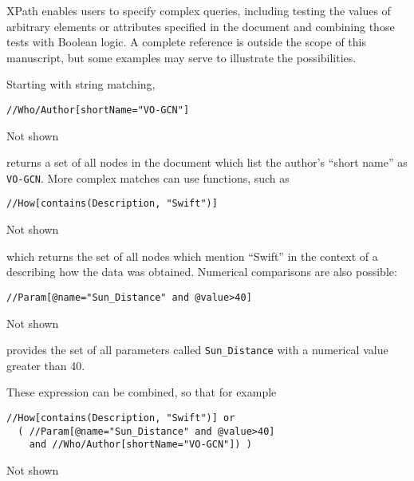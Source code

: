 \documentclass[5p,authoryear]{elsarticle}
\begin{document}
XPath enables users to specify complex queries, including testing
the values of arbitrary elements or attributes specified in the document and
combining those tests with Boolean logic. A complete reference is outside the
scope of this manuscript, but some examples may serve to illustrate the
possibilities.

Starting with string matching,

\begin{listing}[H]
\begin{verbatim}
//Who/Author[shortName="VO-GCN"]
\end{verbatim}
\vspace{-19pt}
\captionsetup{labelsep=none,textformat=empty,justification=raggedleft,singlelinecheck=false}
\caption{Not shown}
\label{xpath:exp1}
\end{listing}

returns a set of all nodes in the document which list the author's ``short
name'' as \texttt{VO-GCN}. More complex matches can use functions, such as

\begin{listing}[H]
\begin{verbatim}
//How[contains(Description, "Swift")]
\end{verbatim}
\vspace{-19pt}
\captionsetup{labelsep=none,textformat=empty,justification=raggedleft,singlelinecheck=false}
\caption{Not shown}
\label{xpath:exp2}
\end{listing}

which returns the set of all nodes which mention ``Swift'' in the context of a
describing how the data was obtained. Numerical comparisons are also possible:

\begin{listing}[H]
\begin{verbatim}
//Param[@name="Sun_Distance" and @value>40]
\end{verbatim}
\vspace{-19pt}
\captionsetup{labelsep=none,textformat=empty,justification=raggedleft,singlelinecheck=false}
\caption{Not shown}
\label{xpath:exp3}
\end{listing}

provides the set of all parameters called \texttt{Sun\_Distance} with a
numerical value greater than 40.

These expression can be combined, so that for example

\begin{listing}[H]
\begin{verbatim}
//How[contains(Description, "Swift")] or
  ( //Param[@name="Sun_Distance" and @value>40]
    and //Who/Author[shortName="VO-GCN"]) )
\end{verbatim}
\vspace{-19pt}
\captionsetup{labelsep=none,textformat=empty,justification=raggedleft,singlelinecheck=false}
\caption{Not shown}
\label{xpath:exp4}
\end{listing}
\end{document}
